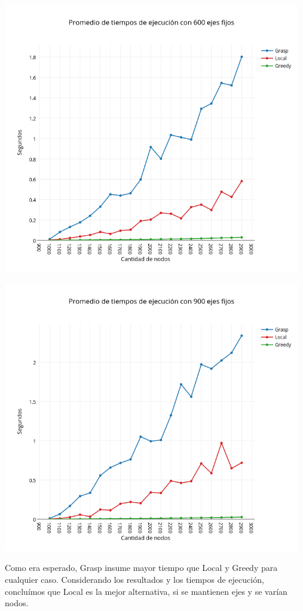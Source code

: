 \begin{center}
 	\includegraphics[width=13cm, keepaspectratio=yes]{imagenes/coliseo/Fixedge/600.png}

 	\includegraphics[width=13cm, keepaspectratio=yes]{imagenes/coliseo/Fixedge/900.png}
\end{center}

Como era esperado, Grasp insume mayor tiempo que Local y Greedy para cualquier caso.
Considerando los resultados y los tiempos de ejecución, concluímos que Local es la mejor alternativa, si se mantienen ejes y se varían nodos.

